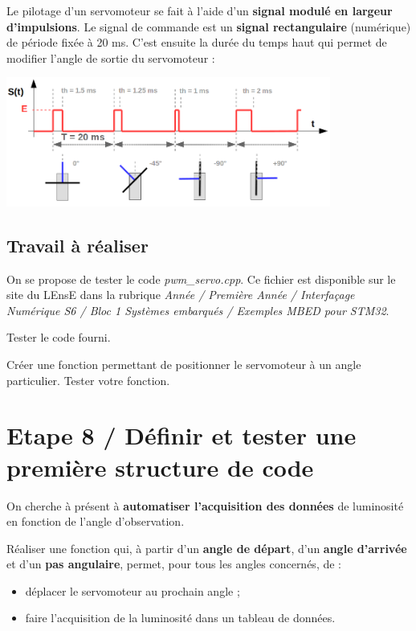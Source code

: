 \documentclass[a4paper,11pt,titlepage]{article} %
\begin{document}
Le pilotage d'un servomoteur se fait à l'aide d'un \textbf{signal modulé en largeur d'impulsions}. Le signal de commande est un \textbf{signal rectangulaire} (numérique) de période fixée à 20 ms. C'est ensuite la durée du temps haut qui permet de modifier l'angle de sortie du servomoteur :

\begin{center}
	\includegraphics[width=0.8\textwidth]{images/MINE_Nucleo_servomoteur.png}
\end{center}

\subsection{Travail à réaliser}

On se propose de tester le code \textsl{pwm\_servo.cpp}. Ce fichier est disponible sur le site du LEnsE dans la rubrique \textit{Année / Première Année / Interfaçage Numérique S6 / Bloc 1 Systèmes embarqués / Exemples MBED pour STM32}.

\Manip Tester le code fourni. 

\Manip Créer une fonction permettant de positionner le servomoteur à un angle particulier. Tester votre fonction. 

\newpage
\section{Etape 8 / Définir et tester une première structure de code}

On cherche à présent à \textbf{automatiser l'acquisition des données} de luminosité en fonction de l'angle d'observation.

\Manip Réaliser une fonction qui, à partir d'un \textbf{angle de départ}, d'un \textbf{angle d'arrivée} et d'un \textbf{pas angulaire}, permet, pour tous les angles concernés, de :

\begin{itemize}
	\item déplacer le servomoteur au prochain angle ;
	\item faire l'acquisition de la luminosité dans un tableau de données.
\end{itemize}
\end{document}
